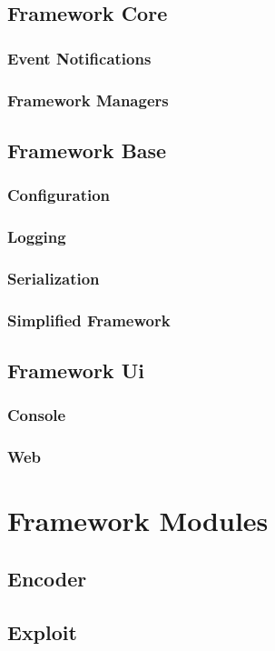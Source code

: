\documentclass{report}
\begin{document}
    \section{Framework Core}
        \subsection{Event Notifications}
        \subsection{Framework Managers}
    \section{Framework Base}
        \subsection{Configuration}
        \subsection{Logging}
        \subsection{Serialization}
        \subsection{Simplified Framework}
    \section{Framework Ui}
        \subsection{Console}
        \subsection{Web}
\chapter{Framework Modules}
    \section{Encoder}
    \section{Exploit}
\end{document}
